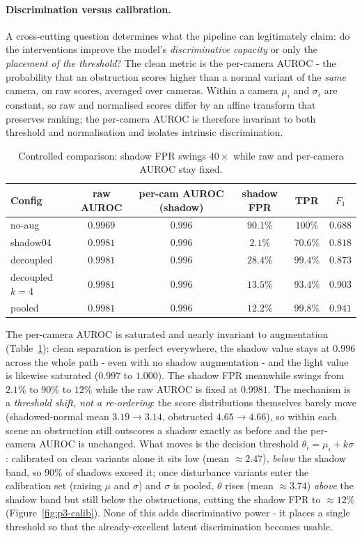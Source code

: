 \paragraph{Discrimination versus calibration.}
A cross-cutting question determines what the pipeline can legitimately claim: do
the interventions improve the model's \emph{discriminative capacity} or only the
\emph{placement of the threshold}? The clean metric is the per-camera AUROC -
the probability that an obstruction scores higher than a normal variant of the
\emph{same} camera, on raw scores, averaged over cameras. Within a camera $\mu_i$
and $\sigma_i$ are constant, so raw and normalised scores differ by an affine
transform that preserves ranking; the per-camera AUROC is therefore invariant to
both threshold and normalisation and isolates intrinsic discrimination.

\begin{table}[h]
  \centering
  \begin{tabular}{lccccc}
    \hline
    Config & raw AUROC & per-cam AUROC (shadow) & shadow FPR & TPR & $F_1$ \\
    \hline
    no-aug & $0.9969$ & $0.996$ & $90.1\%$ & $100\%$ & $0.688$ \\
    shadow04 & $0.9981$ & $0.996$ & $2.1\%$ & $70.6\%$ & $0.818$ \\
    decoupled & $0.9981$ & $0.996$ & $28.4\%$ & $99.4\%$ & $0.873$ \\
    decoupled $k=4$ & $0.9981$ & $0.996$ & $13.5\%$ & $93.4\%$ & $0.903$ \\
    pooled & $0.9981$ & $0.996$ & $12.2\%$ & $99.8\%$ & $0.941$ \\
    \hline
  \end{tabular}
  \caption{Controlled comparison: shadow FPR swings $40\times$ while raw and
  per-camera AUROC stay fixed.}
  \label{tab:p3-disc}
\end{table}

The per-camera AUROC is saturated and nearly invariant to augmentation
(Table~\ref{tab:p3-disc}): clean separation is perfect everywhere, the shadow
value stays at $0.996$ across the whole path - even with no shadow augmentation -
and the light value is likewise saturated ($0.997$ to $1.000$). The shadow FPR
meanwhile swings
from $2.1\%$ to $90\%$ to $12\%$ while the raw AUROC is fixed at $0.9981$. The
mechanism is a \emph{threshold shift, not a re-ordering}: the score distributions
themselves barely move (shadowed-normal mean $3.19 \to 3.14$, obstructed
$4.65 \to 4.66$), so within each scene an obstruction still outscores a shadow
exactly as before and the per-camera AUROC is unchanged. What moves is the
decision threshold $\theta_i = \mu_i + k\sigma$: calibrated on clean variants
alone it sits low (mean $\approx 2.47$), \emph{below} the shadow band, so $90\%$ of
shadows exceed it; once disturbance variants enter the calibration set (raising
$\mu$ and $\sigma$) and $\sigma$ is pooled, $\theta$ rises (mean $\approx 3.74$)
\emph{above} the shadow band but still below the obstructions, cutting the shadow
FPR to $\approx 12\%$ (Figure~\ref{fig:p3-calib}). None of this adds discriminative
power - it places a single threshold so that the already-excellent latent
discrimination becomes usable.

